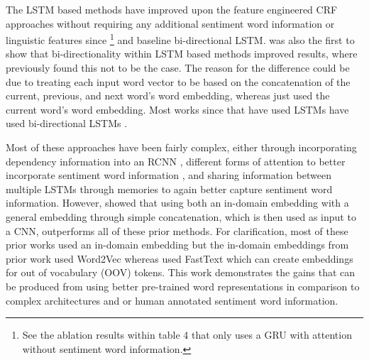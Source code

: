 The LSTM based methods have improved upon the feature engineered CRF approaches without requiring any additional sentiment word information or linguistic features since \citet{wang2017coupled}\footnote{See the ablation results within table 4 that only uses a GRU with attention without sentiment word information.} and \citet{li-lam-2017-deep} baseline bi-directional LSTM. \citet{li-lam-2017-deep} was also the first to show that bi-directionality within LSTM based methods improved results, where previously \citet{liu-etal-2015-fine} found this not to be the case. The reason for the difference could be due to \citet{liu-etal-2015-fine} treating each input word vector to be based on the concatenation of the current, previous, and next word's word embedding, whereas \citet{li-lam-2017-deep} just used the current word's word embedding. Most works since \citet{li-lam-2017-deep} that have used LSTMs have used bi-directional LSTMs \citep{li2018aspect}.

Most of these approaches have been fairly complex, either through incorporating dependency information into an RCNN \citep{wang-etal-2016-recursive}, different forms of attention to better incorporate sentiment word information \citep{wang2017coupled, li2018aspect}, and sharing information between multiple LSTMs through memories \citep{li-lam-2017-deep} to again better capture sentiment word information. However, \citet{xu-etal-2018-double} showed that using both an in-domain embedding with a general embedding through simple concatenation, which is then used as input to a CNN, outperforms all of these prior methods. For clarification, most of these prior works used an in-domain embedding \citep{wang-etal-2016-recursive, wang2017coupled, li-lam-2017-deep} but the in-domain embeddings from prior work used Word2Vec \citep{mikolov2013distributed} whereas \citet{xu-etal-2018-double} used FastText \citep{bojanowski-etal-2017-enriching} which can create embeddings for out of vocabulary (OOV) tokens. This work demonstrates the gains that can be produced from using better pre-trained word representations in comparison to complex architectures and or human annotated sentiment word information.

